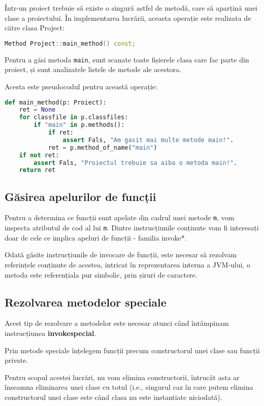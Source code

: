 Într-un proiect trebuie să existe o singură astfel de metodă, care să aparțină
unei clase a proiectului.
În implementarea lucrării, aceasta operație este realizata de
către clasa Project:
\begin{lstlisting}[language=C++]
Method Project::main_method() const;
\end{lstlisting}

Pentru a găsi metoda \texttt{main}, sunt scanate toate fișierele
clasa care fac parte din proiect, și sunt analizatele listele de
metode ale acestora.

Acesta este pseudocodul pentru această operație:
\begin{lstlisting}[language=Python]
def main_method(p: Proiect):
    ret = None
    for classfile in p.classfiles:
        if "main" in p.methods():
            if ret:
                assert Fals, "Am gasit mai multe metode main!".
            ret = p.method_of_name("main")
    if not ret:
        assert Fals, "Proiectul trebuie sa aiba o metoda main!".
    return ret
\end{lstlisting}

\subsection{Găsirea apelurilor de funcții}

Pentru a determina ce funcții sunt apelate din cadrul unei metode \texttt{m},
vom inspecta atributul de cod al lui \texttt{m}.
Dintre instrucțiunile conținute vom fi interesați doar de cele ce implica
apeluri de funcții - familia invoke*.

Odată găsite instrucțiunile de invocare de funcții, este necesar să rezolvam
referințele conținute de acestea, intricat în reprezentarea interna a JVM-ului,
o metoda este referențiala pur simbolic, prin șiruri de caractere.

\subsection{Rezolvarea metodelor speciale}

Acest tip de rezolvare a metodelor este necesar atunci când întâmpinam
instrucțiunea \textbf{invokespecial}.

Prin metode speciale înțelegem funcții precum constructorul unei clase sau
funcții private.

Pentru scopul acestei lucrări, nu vom elimina constructorii,
întrucât asta ar înseamna eliminarea unei clase cu totul (i.e.,
singurul caz în care putem elimina constructorul unei clase este
când clasa nu este instantiate niciodată).

